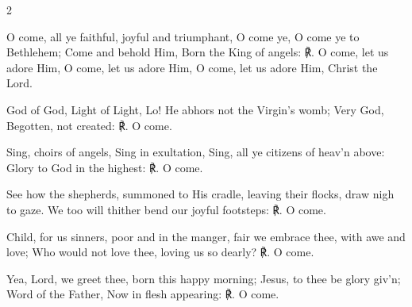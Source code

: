 \begin{multicols}{2}
\raggedcolumns
\begin{enpars}

O come, all ye faithful, joyful and
triumphant, O come ye, O come ye
to Bethlehem; Come and behold
Him, Born the King of angels:
℟. O come, let us adore Him, O
come, let us adore Him, O come,
let us adore Him, Christ the Lord.

God of God, Light of Light, Lo!
He abhors not the Virgin’s womb;
Very God, Begotten, not created: ℟. O come.

Sing, choirs of angels, Sing in
exultation, Sing, all ye citizens of
heav’n above: Glory to God in the
highest: ℟. O come.

See how the shepherds, summoned to His cradle, leaving their
flocks, draw nigh to gaze. We too
will thither bend our joyful
footsteps: ℟. O come.

Child, for us sinners, poor and in
the manger, fair we embrace thee,
with awe and love; Who would not
love thee, loving us so dearly? ℟. O come.

Yea, Lord, we greet thee, born
this happy morning; Jesus, to thee
be glory giv’n; Word of the Father,
Now in flesh appearing: ℟. O come.
\end{enpars}\end{multicols}